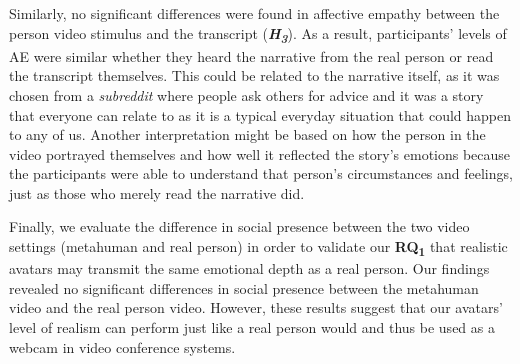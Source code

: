 Similarly, no significant differences were found in affective empathy between the person video stimulus and the transcript (\textbf{\textit{H\textsubscript{3}}}). As a result, participants' levels of AE were similar whether they heard the narrative from the real person or read the transcript themselves. This could be related to the narrative itself, as it was chosen from a \textit{subreddit} where people ask others for advice and it was a story that everyone can relate to as it is a typical everyday situation that could happen to any of us. Another interpretation might be based on how the person in the video portrayed themselves and how well it reflected the story's emotions because the participants were able to understand that person's circumstances and feelings, just as those who merely read the narrative did.

Finally, we evaluate the difference in social presence between the two video settings (metahuman and real person) in order to validate our \textbf{RQ\textsubscript{1}} that realistic avatars may transmit the same emotional depth as a real person. Our findings revealed no significant differences in social presence between the metahuman video and the real person video. However, these results suggest that our avatars' level of realism can perform just like a real person would and thus be used as a webcam in video conference systems.